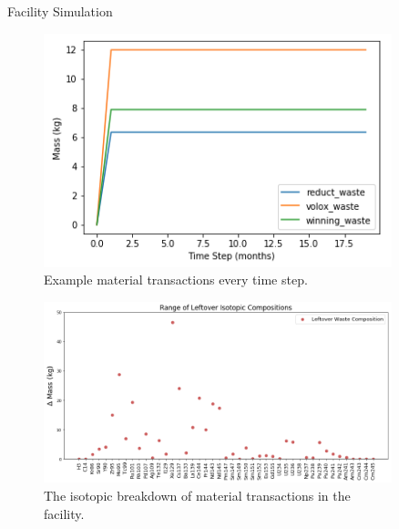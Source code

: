 \documentclass[final]{beamer}
\newlength{\sepwid}
\newlength{\onecolwid}
\newlength{\threecolwid}
\begin{document}
\begin{frame}[t]
\begin{columns}[t,totalwidth=\threecolwid]
\begin{column}{\onecolwid}
\begin{block}{Facility Simulation}
	\begin{figure}
		\includegraphics[width=0.9\linewidth]{timeseries-waste.png}
		\caption{Example material transactions every time step.}
	\end{figure}

	\begin{figure}
		\includegraphics[width=0.9\linewidth]{isotopic-comp-range.png}
		\caption{The isotopic breakdown of material transactions in the facility.}
	\end{figure}
\end{block}


\end{column} %

\begin{column}{\sepwid}\end{column} %



\begin{column}{\onecolwid} %


\end{column}
\end{columns}
\end{frame}
\end{document}
